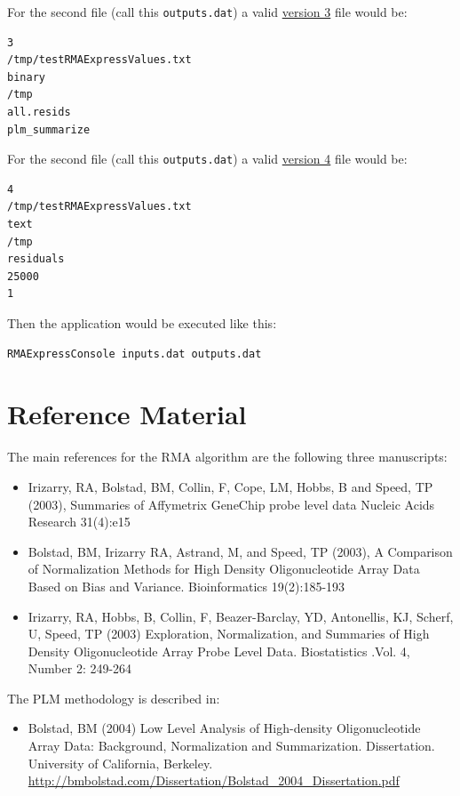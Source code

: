 \documentclass[11pt]{report}
\begin{document}
\noindent  For the second file (call this {\tt outputs.dat}) a valid \underline{version 3} file would be:
\begin{verbatim}
3
/tmp/testRMAExpressValues.txt
binary
/tmp
all.resids
plm_summarize
\end{verbatim}

\noindent  For the second file (call this {\tt outputs.dat}) a valid \underline{version 4} file would be:
\begin{verbatim}
4
/tmp/testRMAExpressValues.txt
text
/tmp
residuals
25000
1
\end{verbatim}



\noindent Then the application would be executed like this:
\begin{verbatim}
RMAExpressConsole inputs.dat outputs.dat
\end{verbatim}



\appendix

\chapter{Reference Material} \label{chap:referencematerial}


The main references for the RMA algorithm are the following three manuscripts:
\begin{itemize}
\item Irizarry, RA, Bolstad, BM, Collin, F, Cope, LM, Hobbs, B and Speed, TP (2003), Summaries of Affymetrix GeneChip probe level data Nucleic Acids Research 31(4):e15

\item Bolstad, BM, Irizarry RA, Astrand, M, and Speed, TP (2003), A Comparison of Normalization Methods for High Density Oligonucleotide Array Data Based on Bias and Variance. Bioinformatics 19(2):185-193
  
\item Irizarry, RA, Hobbs, B, Collin, F, Beazer-Barclay, YD, Antonellis, KJ, Scherf, U, Speed, TP (2003) Exploration, Normalization, and Summaries of High Density Oligonucleotide Array Probe Level Data. Biostatistics .Vol. 4, Number 2: 249-264 
\end{itemize}

The PLM methodology is described in:
\begin{itemize}
\item Bolstad, BM (2004) Low Level Analysis of High-density Oligonucleotide Array Data: Background, Normalization and Summarization. Dissertation. University of California, Berkeley. \url{http://bmbolstad.com/Dissertation/Bolstad_2004_Dissertation.pdf}
\end{itemize}
\end{document}
